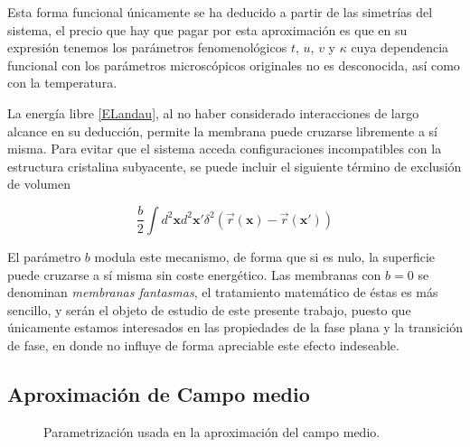 Esta forma funcional únicamente se ha deducido a partir de las simetrías del
sistema, el precio que hay que pagar por esta aproximación es que en su
expresión tenemos los parámetros fenomenológicos $t$, $u$, $v$ y $\kappa$ cuya
dependencia funcional con los parámetros microscópicos originales no es
desconocida, así como con la temperatura.


La energía libre \eqref{ELandau}, al no haber considerado
interacciones de largo alcance en su deducción, permite la membrana puede
cruzarse libremente a sí misma. Para evitar que el sistema acceda
configuraciones incompatibles con la estructura cristalina subyacente, se
puede incluir el siguiente término de exclusión de volumen

\begin{equation*}
\frac{b}{2}\int d^2\mathbf{x} d^2\mathbf{x'}
\delta^2(\vec{r}(\mathbf{x})-\vec{r}(\mathbf{x'}))
\end{equation*}

El parámetro $b$ modula este mecanismo, de forma que si es nulo, la superficie
puede cruzarse a sí misma sin coste energético. Las membranas con $b=0$ se
denominan \textit{membranas fantasmas}, el tratamiento matemático de éstas es
 más sencillo, y serán el objeto de estudio de este presente
trabajo, puesto que únicamente estamos interesados en las propiedades de la
fase plana y la transición de fase, en donde no influye de forma apreciable
este efecto indeseable. 

\subsection{Aproximación de Campo medio}\label{campo_medio}

\begin{figure}[h]
\centering
 \resizebox{\columnwidth}{!}{}
\caption{Parametrización usada en la aproximación del campo medio.}\label{campo-medio-fig}
\end{figure}

